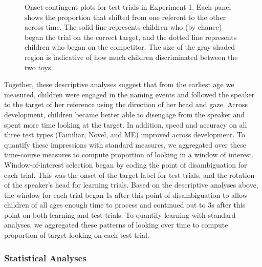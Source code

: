 \documentclass[man,floatsintext]{apa6}
\begin{document}
\begin{figure}[tb]
	\caption{\label{fig:exp1_split} Onset-contingent plots for test trials in Experiment 1. Each panel shows the proportion that shifted from one referent to the other across time. The solid line represents children who (by chance) began the trial on the correct target, and the dotted line represents children who began on the competitor. The size of the gray shaded region is indicative of how much children discriminated between the two toys.}
\end{figure}

Together, these descriptive analyses suggest that from the earliest age we measured, children were engaged in the naming events and followed the speaker to the target of her reference using the direction of her head and gaze. Across development, children became better able to disengage from the speaker and spent more time looking at the target. In addition, speed and accuracy on all three test types (Familiar, Novel, and ME) improved across development. To quantify these impressions with standard measures, we aggregated over these time-course measures to compute proportion of looking in a window of interest. Window-of-interest selection began by coding the point of disambiguation for each trial. This was the onset of the target label for test trials, and the rotation of the speaker's head for learning trials. Based on the descriptive analyses above, the window for each trial began 1s after this point of disambiguation to allow children of all ages enough time to process and continued out to 3s after this point on both learning and test trials. To quantify learning with standard analyses, we aggregated these patterns of looking over time to compute proportion of target looking on each test trial.

\subsubsection{Statistical Analyses}
\end{document}
